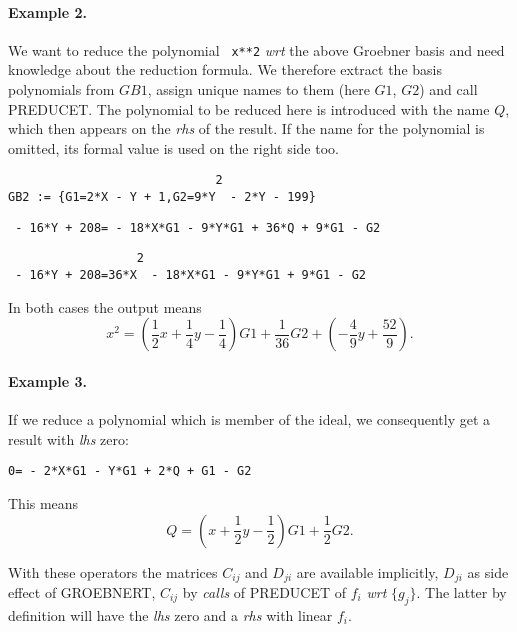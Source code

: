 \paragraph{Example 2.}
We want to reduce the polynomial \verb+ x**2+ {\it  wrt}
the above Groebner basis and need knowledge about the reduction
formula. We therefore extract the basis polynomials from $GB1$,
assign unique names to them (here $G1$, $G2$) and call PREDUCET.
The polynomial to be reduced here is introduced with the name $Q$,
which then appears on the {\it rhs} of the result. If the name for the
polynomial is omitted, its formal value is used on the right side too.

\begin{verbatim}
                             2
GB2 := {G1=2*X - Y + 1,G2=9*Y  - 2*Y - 199}
\end{verbatim}

\begin{verbatim}
 - 16*Y + 208= - 18*X*G1 - 9*Y*G1 + 36*Q + 9*G1 - G2
\end{verbatim}

\begin{verbatim}
                  2
 - 16*Y + 208=36*X  - 18*X*G1 - 9*Y*G1 + 9*G1 - G2

\end{verbatim}

In both cases the output means
\[
x^2 = (\frac{1}{2} x + \frac{1}{4} y - \frac{1}{4}) G1
 + \frac{1}{36} G2 + (-\frac{4}{9} y + \frac{52}{9}).
\]


\paragraph{Example 3.}
If we reduce a polynomial which is member of the ideal, we
consequently get a result with {\it lhs} zero:

\begin{verbatim}
0= - 2*X*G1 - Y*G1 + 2*Q + G1 - G2
\end{verbatim}

This means
\[ Q = ( x + \frac{1}{2} y - \frac{1}{2}) G1 + \frac{1}{2} G2.
\]

With these operators the matrices $C_{ij}$ and $D_{ji}$ are available
implicitly, $D_{ji}$ as side effect of GROEBNERT, $C_{ij}$ by {\it calls}
of PREDUCET of $f_i$ {\it wrt} $\{g_j\}$. The latter by definition will
have the {\it lhs} zero and a {\it rhs} with linear $f_i$.

